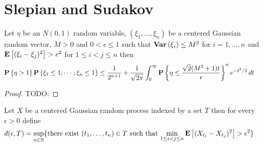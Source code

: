 \section{Slepian and Sudakov}

\begin{lem}\label{ChevetLemma}Let $\eta$ be an $N(0,1)$ random variable, $(\xi_1, \dotsc, \xi_n)$ be a centered Gaussian random vector, $M>0$ and $0 < \epsilon \leq 1$ such that $\textbf{Var} \left (\xi_i \right ) \leq M^2$ for $i=1, \dotsc, n$ and $\textbf{E}\left[(\xi_i - \xi_j)^2\right] > \epsilon^2$ for $1 \leq i < j \leq n$ then 
\begin{align*}
\textbf{P}\left \{\eta > 1 \right \} \textbf{P}\left \{\xi_1 \leq 1; \dotsb ; \xi_n \leq 1 \right \}
&\leq \frac{1}{2^{n+1}} + \frac{1}{\sqrt{2\pi}} \int_0^\infty \textbf{P}\left \{\eta \leq \frac{\sqrt{2}(M^2+1)t}{\epsilon} \right \}^n e^{-t^2/2} \, dt
\end{align*}
\end{lem}
\begin{proof}
TODO:
\end{proof}

\begin{defn}Let $X$ be a centered Gaussian random process indexed by a set $T$ then for every $\epsilon>0$ define
\begin{align*}
d(\epsilon, T) &= 
\sup_{n \in \mathbb{N}} \lbrace \text{there exist $(t_1, \dotsc, t_n) \in T$ such that $\min_{1 \leq i < j \leq n}\textbf{E}\left[(X_{t_i} -X_{t_j})^2\right] > \epsilon^2$} \rbrace
\end{align*}
\end{defn}

